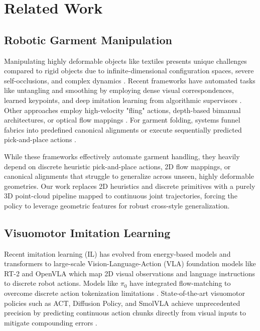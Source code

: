 \section{Related Work}

\subsection{Robotic Garment Manipulation}
Manipulating highly deformable objects like textiles presents unique challenges compared to rigid objects due to infinite-dimensional configuration spaces, severe self-occlusions, and complex dynamics \cite{longhini2024unfolding, 8957044}. Recent frameworks have automated tasks like untangling and smoothing by employing dense visual correspondences, learned keypoints, and deep imitation learning from algorithmic supervisors \cite{ganapathi2020learningdensevisualcorrespondences, grannen2020untanglingdenseknotslearning, seita2020deepimitationlearningsequential}. Other approaches employ high-velocity "fling" actions, depth-based bimanual architectures, or optical flow mappings \cite{DBLP:journals/corr/abs-2105-03655, avigal2022speedfolding, weng2022fabricflownet}. For garment folding, systems funnel fabrics into predefined canonical alignments or execute sequentially predicted pick-and-place actions \cite{canberk2022clothfunnelscanonicalizedalignmentmultipurpose, unifolding2023}.

While these frameworks effectively automate garment handling, they heavily depend on discrete heuristic pick-and-place actions, 2D flow mappings, or canonical alignments that struggle to generalize across unseen, highly deformable geometries. Our work replaces 2D heuristics and discrete primitives with a purely 3D point-cloud pipeline mapped to continuous joint trajectories, forcing the policy to leverage geometric features for robust cross-style generalization.

\subsection{Visuomotor Imitation Learning}
Recent imitation learning (IL) has evolved from energy-based models and transformers \cite{florence2021implicitbehavioralcloning, shafiullah2022behaviortransformerscloningk, zeng2022transporternetworksrearrangingvisual} to large-scale Vision-Language-Action (VLA) foundation models like RT-2 and OpenVLA \cite{brohan2023rt1roboticstransformerrealworld, brohan2023rt2visionlanguageactionmodelstransfer, kim2024openvlaopensourcevisionlanguageactionmodel} which map 2D visual observations and language instructions to discrete robot actions. Models like $\pi_0$ have integrated flow-matching to overcome discrete action tokenization limitations \cite{black2026pi0visionlanguageactionflowmodel}. State-of-the-art visuomotor policies such as ACT, Diffusion Policy, and SmolVLA achieve unprecedented precision by predicting continuous action chunks directly from visual inputs to mitigate compounding errors \cite{zhao2023act, chi2023diffusionpolicy, smolvla2025}.

